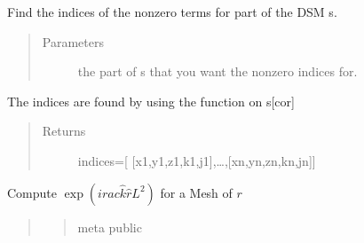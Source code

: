\documentclass[letterpaper,10pt,english]{sphinxmanual}
\begin{document}
\begin{fulllineitems}
\begin{fulllineitems}
\begin{quote}
\begin{description}
\end{description}\end{quote}

\end{fulllineitems}


\begin{fulllineitems}
\label{\detokenize{index:DictionarySparseMatrix.DS.nonzeroMat}}
Find the indices of the nonzero terms for part of the DSM s.
\begin{quote}\begin{description}
\item[{Parameters}] \leavevmode
{} \textendash{} the part of s that you want the nonzero indices for.

\end{description}\end{quote}

The indices are found by using the {\hyperref[\detokenize{index:DictionarySparseMatrix.DS.nonzero}]{}} function on s{[}cor{]}
\begin{quote}\begin{description}
\item[{Returns}] \leavevmode
indices={[} {[}x1,y1,z1,k1,j1{]},…,{[}xn,yn,zn,kn,jn{]}{]}

\end{description}\end{quote}

\end{fulllineitems}


\begin{fulllineitems}
\label{\detokenize{index:DictionarySparseMatrix.DS.phase_calc}}
Compute \(\exp(i
rac{\hat{k}\hat{r}}{L^2})\)     for a Mesh of \(r\)
\begin{quote}
\begin{quote}\begin{description}
\item[{meta public}] \leavevmode
\end{description}\end{quote}


\end{quote}
\end{fulllineitems}
\end{fulllineitems}
\end{document}

